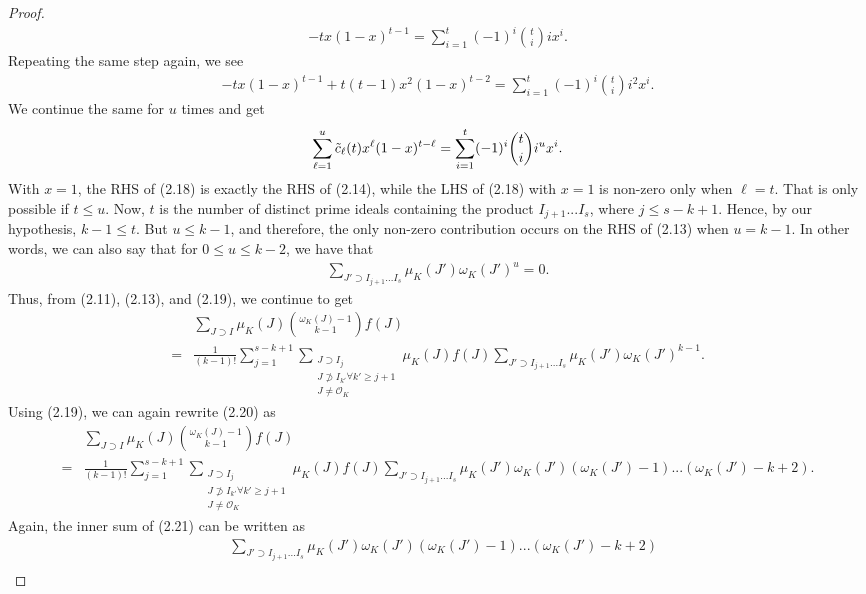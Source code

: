 \documentclass[12pt]{article}
\numberwithin{equation}{section}
\numberwithin{equation}{section}
\begin{document}
\begin{proof}
\begin{align}
    -tx(1-x)^{t-1} = \sum_{i=1}^{t}(-1)^i{t \choose i}ix^i.
\end{align}
Repeating the same step again, we see 
\begin{align}
    -tx(1-x)^{t-1}+t(t-1)x^2(1-x)^{t-2} = \sum_{i=1}^{t}(-1)^i{t \choose i}i^2x^i.
\end{align}
We continue the same for $u$ times and get
\begin{align}
    \sum_{\ell=1}^{u}\Tilde{c}_{\ell}(t)x^{\ell}(1-x)^{t-\ell} = \sum_{i=1}^{t} (-1)^i{t \choose i}i^ux^i.
\end{align}
With $x=1$, the RHS of (2.18) is exactly the RHS of (2.14), while the LHS of (2.18) with $x=1$ is non-zero only when $\ell = t$. That is only possible if $t\leq u$. Now, $t$ is the number of distinct prime ideals containing the product $I_{j+1}...I_s$, where $j \leq s-k+1$. Hence, by our hypothesis, $k-1 \leq t$. But $u \leq k-1$, and therefore, the only non-zero contribution occurs on the RHS of (2.13) when $u=k-1$. In other words, we can also say that for $0 \leq u \leq k-2$, we have that 
\begin{align}
    \sum_{J'\supset I_{j+1}...I_s}\mu_K(J')\omega_K(J')^u  = 0 .
\end{align}
Thus, from (2.11), (2.13), and (2.19), we continue to get
\begin{align}
     &\sum_{J \supset I}\mu_K(J){{\omega_K(J)-1} \choose k-1}f(J) \nonumber \\ =& \frac{1}{(k-1)! } \sum_{j=1}^{s-k+1} \sum_{\substack{J \supset I_j \\ J \not \supset I_{k'} \forall k' \geq j+1 \\ J \neq \mathcal{O}_K}} \mu_K(J)f(J)  \sum_{J'\supset I_{j+1}...I_s}\mu_K(J')\omega_K(J')^{k-1}.
\end{align}
Using (2.19), we can again rewrite (2.20) as
\begin{align}
     &\sum_{J \supset I}\mu_K(J){{\omega_K(J)-1} \choose k-1}f(J) \nonumber \\ =& \frac{1}{(k-1)! } \sum_{j=1}^{s-k+1} \sum_{\substack{J \supset I_j \\ J \not \supset I_{k'} \forall k' \geq j+1 \\ J \neq \mathcal{O}_K}} \mu_K(J)f(J)  \sum_{J'\supset I_{j+1}...I_s}\mu_K(J') \omega_K(J')(\omega_K(J')-1)...(\omega_K(J')-k+2).
\end{align}
Again, the inner sum of (2.21) can be written as
\begin{align}
    & \sum_{J'\supset I_{j+1}...I_s}\mu_K(J') \omega_K(J')(\omega_K(J')-1)...(\omega_K(J')-k+2) \nonumber \\

\end{align}
\end{proof}
\end{document}
